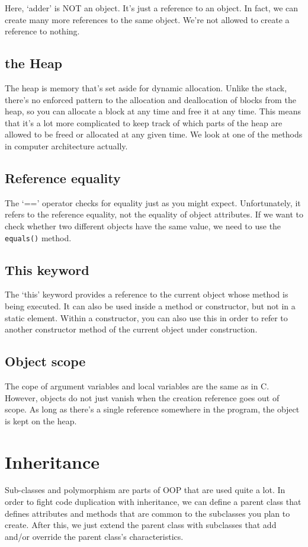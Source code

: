 \documentclass[11pt,a4paper,titlepage,dvipsnames,cmyk]{scrartcl}
\begin{document}
Here, `adder' is NOT an object. It's just a reference to an object. In
fact, we can create many more references to the same object. We're not
allowed to create a reference to nothing.

\subsection{the Heap}%
\label{sub:the Heap}
The heap is memory that's set aside for dynamic allocation. Unlike the
stack, there's no enforced pattern to the allocation and deallocation of
blocks from the heap, so you can allocate a block at any time and free it
at any time. This means that it's a lot more complicated to keep track of
which parts of the heap are allowed to be freed or allocated at any given
time. We look at one of the methods in computer architecture actually. 

\subsection{Reference equality}%
\label{sub:reference}
The `==' operator checks for equality just as you might expect.
Unfortunately, it refers to the reference equality, not the equality of
object attributes. If we want to check whether two different objects have
the same value, we need to use the \lstinline|equals()| method.

\subsection{This keyword}%
\label{sub:This keyword}
The `this' keyword provides a reference to the current object whose method
is being executed. It can also be used inside a method or constructor, but
not in a static element. Within a constructor, you can also use this in
order to refer to another constructor method of the current object under
construction.

\subsection{Object scope}%
\label{sub:Object scope}
The cope of argument variables and local variables are the same as in C.
However, objects do not just vanish when the creation reference goes out
of scope. As long as there's a single reference somewhere in the program,
the object is kept on the heap.

\section{Inheritance}%
\label{sec:Inheritance}
Sub-classes and polymorphism are parts of OOP that are used quite a lot.
In order to fight code duplication with inheritance, we can define a
parent class that defines attributes and methods that are common to the
subclasses you plan to create. After this, we just extend the parent class
with subclasses that add and/or override the parent class's
characteristics.
\end{document}
